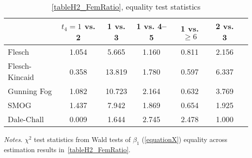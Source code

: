 \begin{table}[H]
    \footnotesize
    \centering
    \begin{threeparttable}
        \caption{\autoref{tableH2_FemRatio}, equality test statistics}
        \label{tableH3}
        \begin{tabular}{p{3cm}S@{}S@{}S@{}S@{}S@{}S@{}}
            \toprule
            &{\(t_4=1\) vs. 2}&{1 vs. 3}&{1 vs. 4--5}&{1 vs. \(\ge6\)}&{2 vs. 3}\\
            \midrule
            Flesch              &       1.054&       5.665&       1.160&       0.811&       2.156\\
            Flesch-Kincaid      &       0.358&      13.819&       1.780&       0.597&       6.337\\
            Gunning Fog         &       1.082&      10.723&       2.164&       0.632&       3.769\\
            SMOG                &       1.437&       7.942&       1.869&       0.654&       1.925\\
            Dale-Chall          &       0.009&       1.644&       2.745&       2.478&       1.000\\
            \bottomrule
        \end{tabular}
        \begin{tablenotes}
            \tiny
            \item \textit{Notes}. \(\chi^2\) test statistics from Wald tests of \(\beta_1\) (\autoref{equationX}) equality across estimation results in~\autoref{tableH2_FemRatio}.
        \end{tablenotes}
    \end{threeparttable}
\end{table}